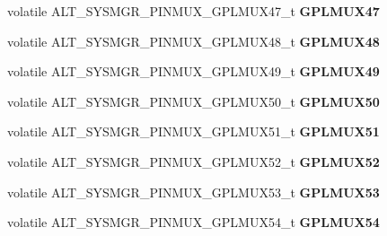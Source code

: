 \begin{DoxyCompactItemize}
volatile A\+L\+T\+\_\+\+S\+Y\+S\+M\+G\+R\+\_\+\+P\+I\+N\+M\+U\+X\+\_\+\+G\+P\+L\+M\+U\+X47\+\_\+t {\bfseries G\+P\+L\+M\+U\+X47}
\item 
\mbox{\label{structALT__SYSMGR__PINMUX__s_aa8bdbb21aa80da2b97e177f3a4e7bd92}} 
volatile A\+L\+T\+\_\+\+S\+Y\+S\+M\+G\+R\+\_\+\+P\+I\+N\+M\+U\+X\+\_\+\+G\+P\+L\+M\+U\+X48\+\_\+t {\bfseries G\+P\+L\+M\+U\+X48}
\item 
\mbox{\label{structALT__SYSMGR__PINMUX__s_a155db189a4770c86848ed568b61f6709}} 
volatile A\+L\+T\+\_\+\+S\+Y\+S\+M\+G\+R\+\_\+\+P\+I\+N\+M\+U\+X\+\_\+\+G\+P\+L\+M\+U\+X49\+\_\+t {\bfseries G\+P\+L\+M\+U\+X49}
\item 
\mbox{\label{structALT__SYSMGR__PINMUX__s_aee005ba1f13bf21e6aef8f3e4ec5dbbd}} 
volatile A\+L\+T\+\_\+\+S\+Y\+S\+M\+G\+R\+\_\+\+P\+I\+N\+M\+U\+X\+\_\+\+G\+P\+L\+M\+U\+X50\+\_\+t {\bfseries G\+P\+L\+M\+U\+X50}
\item 
\mbox{\label{structALT__SYSMGR__PINMUX__s_ab5619bd343d4aa6bb68515e2f26f3973}} 
volatile A\+L\+T\+\_\+\+S\+Y\+S\+M\+G\+R\+\_\+\+P\+I\+N\+M\+U\+X\+\_\+\+G\+P\+L\+M\+U\+X51\+\_\+t {\bfseries G\+P\+L\+M\+U\+X51}
\item 
\mbox{\label{structALT__SYSMGR__PINMUX__s_ad6c685f283bc2033227337870cf3ac9f}} 
volatile A\+L\+T\+\_\+\+S\+Y\+S\+M\+G\+R\+\_\+\+P\+I\+N\+M\+U\+X\+\_\+\+G\+P\+L\+M\+U\+X52\+\_\+t {\bfseries G\+P\+L\+M\+U\+X52}
\item 
\mbox{\label{structALT__SYSMGR__PINMUX__s_a978a2ed7bdd9ca66282dcb31410769b5}} 
volatile A\+L\+T\+\_\+\+S\+Y\+S\+M\+G\+R\+\_\+\+P\+I\+N\+M\+U\+X\+\_\+\+G\+P\+L\+M\+U\+X53\+\_\+t {\bfseries G\+P\+L\+M\+U\+X53}
\item 
\mbox{\label{structALT__SYSMGR__PINMUX__s_a5fb5efd0ba3bce76371233da14a66a41}} 
volatile A\+L\+T\+\_\+\+S\+Y\+S\+M\+G\+R\+\_\+\+P\+I\+N\+M\+U\+X\+\_\+\+G\+P\+L\+M\+U\+X54\+\_\+t {\bfseries G\+P\+L\+M\+U\+X54}
\item 
\mbox{\label{structALT__SYSMGR__PINMUX__s_a86f7b0e43e4fdc84448b57582b1ad886}} 

\end{DoxyCompactItemize}
